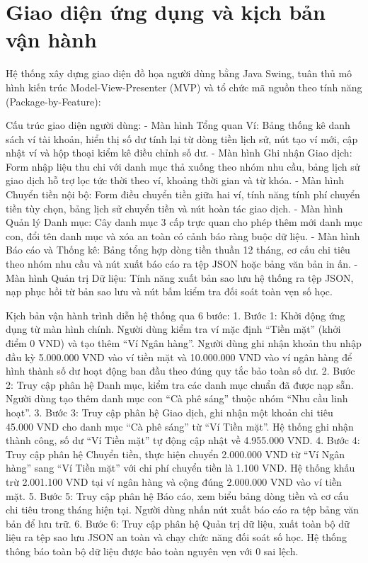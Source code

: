 \documentclass[a4paper,12pt]{report}
\begin{document}
\section{Giao diện ứng dụng và kịch bản vận
hành}\label{giao-diux1ec7n-ux1ee9ng-dux1ee5ng-vuxe0-kux1ecbch-bux1ea3n-vux1eadn-huxe0nh}

Hệ thống xây dựng giao diện đồ họa người dùng bằng Java Swing, tuân thủ
mô hình kiến trúc Model-View-Presenter (MVP) và tổ chức mã nguồn theo
tính năng (Package-by-Feature):

Cấu trúc giao diện người dùng: - Màn hình Tổng quan Ví: Bảng thống kê
danh sách ví tài khoản, hiển thị số dư tính lại từ dòng tiền lịch sử,
nút tạo ví mới, cập nhật ví và hộp thoại kiểm kê điều chỉnh số dư. - Màn
hình Ghi nhận Giao dịch: Form nhập liệu thu chi với danh mục thả xuống
theo nhóm nhu cầu, bảng lịch sử giao dịch hỗ trợ lọc tức thời theo ví,
khoảng thời gian và từ khóa. - Màn hình Chuyển tiền nội bộ: Form điều
chuyển tiền giữa hai ví, tính năng tính phí chuyển tiền tùy chọn, bảng
lịch sử chuyển tiền và nút hoàn tác giao dịch. - Màn hình Quản lý Danh
mục: Cây danh mục 3 cấp trực quan cho phép thêm mới danh mục con, đổi
tên danh mục và xóa an toàn có cảnh báo ràng buộc dữ liệu. - Màn hình
Báo cáo và Thống kê: Bảng tổng hợp dòng tiền thuần 12 tháng, cơ cấu chi
tiêu theo nhóm nhu cầu và nút xuất báo cáo ra tệp JSON hoặc bảng văn bản
in ấn. - Màn hình Quản trị Dữ liệu: Tính năng xuất bản sao lưu hệ thống
ra tệp JSON, nạp phục hồi từ bản sao lưu và nút bấm kiểm tra đối soát
toàn vẹn số học.

Kịch bản vận hành trình diễn hệ thống qua 6 bước: 1. Bước 1: Khởi động
ứng dụng từ màn hình chính. Người dùng kiểm tra ví mặc định ``Tiền mặt''
(khởi điểm 0 VND) và tạo thêm ``Ví Ngân hàng''. Người dùng ghi nhận
khoản thu nhập đầu kỳ 5.000.000 VND vào ví tiền mặt và 10.000.000 VND
vào ví ngân hàng để hình thành số dư hoạt động ban đầu theo đúng quy tắc
bảo toàn số dư. 2. Bước 2: Truy cập phân hệ Danh mục, kiểm tra các danh
mục chuẩn đã được nạp sẵn. Người dùng tạo thêm danh mục con ``Cà phê
sáng'' thuộc nhóm ``Nhu cầu linh hoạt''. 3. Bước 3: Truy cập phân hệ
Giao dịch, ghi nhận một khoản chi tiêu 45.000 VND cho danh mục ``Cà phê
sáng'' từ ``Ví Tiền mặt''. Hệ thống ghi nhận thành công, số dư ``Ví Tiền
mặt'' tự động cập nhật về 4.955.000 VND. 4. Bước 4: Truy cập phân hệ
Chuyển tiền, thực hiện chuyển 2.000.000 VND từ ``Ví Ngân hàng'' sang
``Ví Tiền mặt'' với chi phí chuyển tiền là 1.100 VND. Hệ thống khấu trừ
2.001.100 VND tại ví ngân hàng và cộng đúng 2.000.000 VND vào ví tiền
mặt. 5. Bước 5: Truy cập phân hệ Báo cáo, xem biểu bảng dòng tiền và cơ
cấu chi tiêu trong tháng hiện tại. Người dùng nhấn nút xuất báo cáo ra
tệp bảng văn bản để lưu trữ. 6. Bước 6: Truy cập phân hệ Quản trị dữ
liệu, xuất toàn bộ dữ liệu ra tệp sao lưu JSON an toàn và chạy chức năng
đối soát số học. Hệ thống thông báo toàn bộ dữ liệu được bảo toàn nguyên
vẹn với 0 sai lệch.
\end{document}
